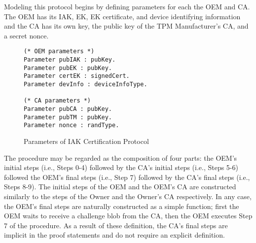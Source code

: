 Modeling this protocol begins by defining parameters for each the OEM and CA. The OEM has its IAK, EK, EK certificate, and device identifying information and the CA has its own key, the public key of the TPM Manufacturer's CA, and a secret nonce.
\begin{figure}[h]
\begin{lstlisting}[language=Coq]
(* OEM parameters *)
Parameter pubIAK : pubKey.
Parameter pubEK : pubKey.
Parameter certEK : signedCert.
Parameter devInfo : deviceInfoType.

(* CA parameters *)
Parameter pubCA : pubKey.
Parameter pubTM : pubKey.
Parameter nonce : randType.
\end{lstlisting}
\caption{Parameters of IAK Certification Protocol}
\end{figure}
The procedure may be regarded as the composition of four parts: the OEM's initial steps (i.e., Steps 0-4) followed by the CA's initial steps (i.e., Steps 5-6) followed the OEM's final steps (i.e., Step 7) followed by the CA's final steps (i.e., Steps 8-9). The initial steps of the OEM and the OEM's CA are constructed similarly to the steps of the Owner and the Owner's CA respectively. In any case, the OEM's final steps are naturally constructed as a simple function; first the OEM waits to receive a challenge blob from the CA, then the OEM executes Step 7 of the procedure. As a result of these definition, the CA's final steps are implicit in the proof statements and do not require an explicit definition. 
